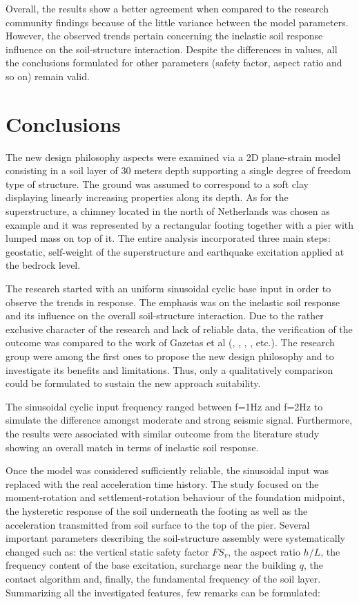 Overall, the results show a better agreement when compared to the research community findings because of the little variance between the model parameters. However, the observed trends pertain concerning the inelastic soil response influence on the soil-structure interaction. Despite the differences in values, all the conclusions formulated for other parameters (safety factor, aspect ratio and so on) remain valid.

\newpage
\section{Conclusions}
The new design philosophy aspects were examined via a 2D plane-strain model consisting in a soil layer of 30 meters depth supporting a single degree of freedom type of structure. The ground was assumed to correspond to a soft clay displaying linearly increasing properties along its depth. As for the superstructure, a chimney located in the north of Netherlands was chosen as example and it was represented by a rectangular footing together with a pier with lumped mass on top of it. The entire analysis incorporated three main steps: geostatic, self-weight of the superstructure and earthquake excitation applied at the bedrock level. 

The research started with an uniform sinusoidal cyclic base input in order to observe the trends in response. The emphasis was on the inelastic soil response and its influence on the overall soil-structure interaction. Due to the rather exclusive character of the research and lack of reliable data, the verification of the outcome was compared to the work of Gazetas et al (\cite{gazetas2004nonlinear}, \cite{anastasopoulos2010soil}, \cite{anastasopoulos2014simplified}, \cite{drosos2012soil}, etc.). The research group were among the first ones to propose the new design philosophy and to investigate its benefits and limitations. Thus, only a qualitatively comparison could be formulated to sustain the new approach suitability.

The sinusoidal cyclic input frequency ranged between f=1Hz and f=2Hz to simulate the difference amongst moderate and strong seismic signal. Furthermore, the results were associated with similar outcome from the literature study showing an overall match in terms of inelastic soil response.

Once the model was considered sufficiently reliable, the sinusoidal input was replaced with the real acceleration time history. The study focused on the moment-rotation and settlement-rotation behaviour of the foundation midpoint, the hysteretic response of the soil underneath the footing as well as the acceleration transmitted from soil surface to the top of the pier. Several important parameters describing the soil-structure assembly were systematically changed such as: the vertical static safety factor $FS_v$, the aspect ratio $h/L$, the frequency content of the base excitation, surcharge near the building $q$, the contact algorithm and, finally, the fundamental frequency of the soil layer. Summarizing all the investigated features, few remarks can be formulated:

